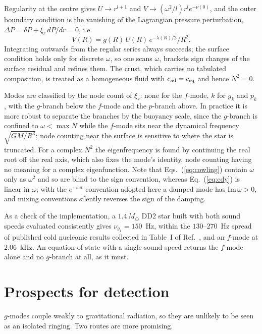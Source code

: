 \documentclass[aps,prd,twocolumn,superscriptaddress,nofootinbib,10pt]{revtex4-2}
\begin{document}
Regularity at the centre gives $U\to r^{l+1}$ and
$V\to(\omega^{2}/l)r^{l}e^{-\nu(0)}$, and the outer boundary condition is the
vanishing of the Lagrangian pressure perturbation,
$\Delta P=\delta P+\xi_{r}\,dP/dr=0$, i.e.
\begin{equation}
  V(R) = g(R)\,U(R)\,e^{-\lambda(R)/2}/R^{2}.
\end{equation}
Integrating outwards from the regular series always succeeds; the surface
condition holds only for discrete $\omega$, so one scans $\omega$, brackets sign
changes of the surface residual and refines them. The crust, which carries no
tabulated composition, is treated as a homogeneous fluid with
$c_{\rm ad}=c_{\rm eq}$ and hence $N^{2}=0$.

Modes are classified by the node count of $\xi_{r}$: none for the $f$-mode, $k$
for $g_{k}$ and $p_{k}$, with the $g$-branch below the $f$-mode and the
$p$-branch above. In practice it is more robust to separate the branches by the
buoyancy scale, since the $g$-branch is confined to $\omega<\max N$ while the
$f$-mode sits near the dynamical frequency $\sqrt{GM/R^{3}}$; node counting near
the surface is sensitive to where the star is truncated. For a complex $N^{2}$
the eigenfrequency is found by continuing the real root off the real axis,
which also fixes the mode's identity, node counting having no meaning for a
complex eigenfunction. Note that Eqs.~(\ref{eq:cowling}) contain $\omega$ only
as $\omega^{2}$ and so are blind to the sign convention, whereas
Eq.~(\ref{eq:cdy}) is linear in $\omega$; with the $e^{+i\omega t}$ convention
adopted here a damped mode has $\mathrm{Im}\,\omega>0$, and mixing conventions
silently reverses the sign of the damping.

As a check of the implementation, a $1.4\,M_{\odot}$ DD2 star built with both
sound speeds evaluated consistently gives $\nu_{g_{1}}=150$~Hz, within the
$130$--$270$~Hz spread of published cold nucleonic results collected in Table~I
of Ref.~\cite{Jaikumar2021}, and an $f$-mode at $2.06$~kHz. An equation of
state with a single sound speed returns the $f$-mode alone and no $g$-branch at
all, as it must.

\section{Prospects for detection}

$g$-modes couple weakly to gravitational radiation, so they are unlikely to be
seen as an isolated ringing. Two routes are more promising.
\end{document}
